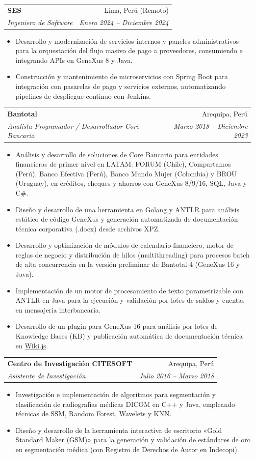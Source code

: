 \documentclass[letterpaper,10pt]{article}
\makeatletter
\newcommand{\resumeItem}[1]{
  \item\small{
    {#1 \vspace{-1.5pt}}
  }
}
\newcommand{\resumeSubheading}[4]{
  \vspace{-3pt}\item
    \begin{tabular*}{\linewidth}[t]{l@{\extracolsep{\fill}}r}
      \textbf{#1} & \small #2 \\
      \textit{\small#3} & \textit{\small #4} \\
    \end{tabular*}\vspace{-4.5pt}
}
\newcommand{\resumeItemListStart}{\begin{itemize}[leftmargin=0.15in, itemsep=0.8pt, topsep=1pt, parsep=0pt, partopsep=0pt]}
\newcommand{\resumeItemListEnd}{\end{itemize}\vspace{-3pt}}
\makeatother
\begin{document}
    \resumeSubheading
      {SES}{Lima, Perú (Remoto)}
      {Ingeniero de Software}{Enero 2024 -- Diciembre 2024}
      \resumeItemListStart
        \resumeItem{Desarrollo y modernización de servicios internos y paneles administrativos para la orquestación del flujo masivo de pago a proveedores, consumiendo e integrando APIs en GeneXus 8 y Java.}
        \resumeItem{Construcción y mantenimiento de microservicios con Spring Boot para integración con pasarelas de pago y servicios externos, automatizando pipelines de despliegue continuo con Jenkins.}
      \resumeItemListEnd

    \resumeSubheading
      {Bantotal}{Arequipa, Perú}
      {Analista Programador / Desarrollador Core Bancario}{Marzo 2018 -- Diciembre 2023}
      \resumeItemListStart
        \resumeItem{Análisis y desarrollo de soluciones de Core Bancario para entidades financieras de primer nivel en LATAM: FORUM (Chile), Compartamos (Perú), Banco Efectiva (Perú), Banco Mundo Mujer (Colombia) y BROU (Uruguay), en créditos, cheques y ahorros con GeneXus 8/9/16, SQL, Java y C\#.}
        \resumeItem{Diseño y desarrollo de una herramienta en Golang y \href{https://www.antlr.org/}{ANTLR} para análisis estático de código GeneXus y generación automatizada de documentación técnica corporativa (.docx) desde archivos XPZ.}
        \resumeItem{Desarrollo y optimización de módulos de calendario financiero, motor de reglas de negocio y distribución de hilos (multithreading) para procesos batch de alta concurrencia en la versión preliminar de Bantotal 4 (GeneXus 16 y Java).}
        \resumeItem{Implementación de un motor de procesamiento de texto parametrizable con ANTLR en Java para la ejecución y validación por lotes de saldos y cuentas en mensajería interbancaria.}
        \resumeItem{Desarrollo de un plugin para GeneXus 16 para análisis por lotes de Knowledge Bases (KB) y publicación automática de documentación técnica en \href{https://js.wiki/}{Wiki.js}.}
      \resumeItemListEnd

    \resumeSubheading
      {Centro de Investigación CITESOFT}{Arequipa, Perú}
      {Asistente de Investigación}{Julio 2016 -- Marzo 2018}
      \resumeItemListStart
        \resumeItem{Investigación e implementación de algoritmos para segmentación y clasificación de radiografías médicas DICOM en C++ y Java, empleando técnicas de SSM, Random Forest, Wavelets y KNN.}
        \resumeItem{Diseño y desarrollo de la herramienta interactiva de escritorio «Gold Standard Maker (GSM)» para la generación y validación de estándares de oro en segmentación médica (con Registro de Derechos de Autor en Indecopi).}
      \resumeItemListEnd
\end{document}
